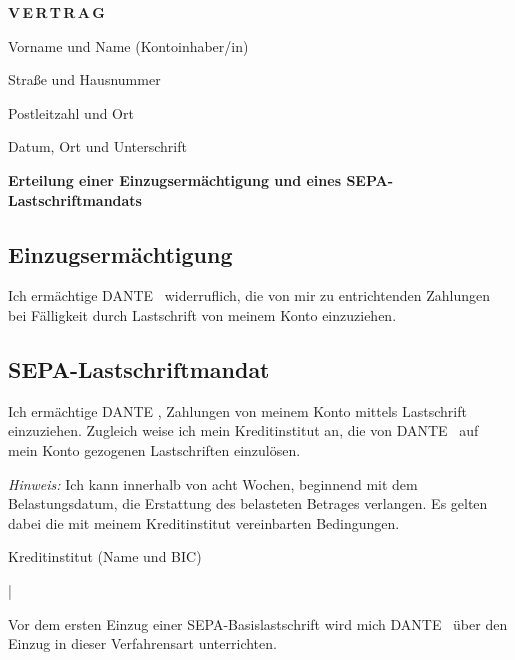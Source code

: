 \documentclass[ngerman]{article}
\begin{document}
\textbf{\textsf{V\,E\,R\,T\,R\,A\,G}}

\bigskip
Vorname und Name (Kontoinhaber/in)\\

\bigskip
Straße und Hausnummer\\

\bigskip
Postleitzahl und Ort\\


\bigskip
Datum, Ort und Unterschrift\\

\bigskip
\textbf{Erteilung einer Einzugsermächtigung und eines SEPA-Lastschriftmandats}


\subsection{Einzugsermächtigung}
Ich ermächtige DANTE \eV\ widerruflich, die von mir zu entrichtenden Zahlungen bei Fälligkeit 
durch Lastschrift von meinem Konto einzuziehen.

\subsection{SEPA-Lastschriftmandat}

Ich ermächtige DANTE \eV, Zahlungen von meinem Konto mittels Lastschrift einzuziehen. 
Zugleich weise ich mein Kreditinstitut an, die von DANTE \eV\ auf mein Konto 
gezogenen Lastschriften einzulösen.


\emph{Hinweis:} Ich kann innerhalb von acht Wochen, beginnend mit dem Belastungsdatum,
die Erstattung des belasteten Betrages verlangen. Es gelten dabei die mit meinem
Kreditinstitut vereinbarten Bedingungen.


\bigskip
Kreditinstitut (Name und BIC)\\


\def\VierU{\string\137 \string\137 \string\137 \string\137 }
\bigskip
\ttfamily
{}|%
\infoInput[8em]{\VierU \VierU \VierU \VierU }\infoInput[2em]{\kern2pt\_\kern2pt\_}\\


\rmfamily
Vor dem ersten Einzug einer SEPA-Basislastschrift wird mich DANTE \eV\ über
den Einzug in dieser Verfahrensart unterrichten. 
\end{document}
